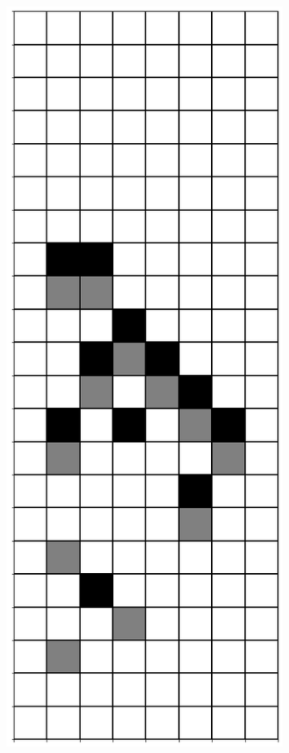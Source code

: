 \documentclass[12pt]{article}
\numberwithin{figure}{section} %
\begin{document}
\begin{figure}[H]
\begin{subfigure}{0.19\textwidth}
     \subcaption{}
   \end{subfigure}
        \begin{subfigure}{0.19\textwidth}
     \centering
     \includegraphics[width=\linewidth]{Section4/28.2}

\end{subfigure}
\end{figure}
\end{document}
